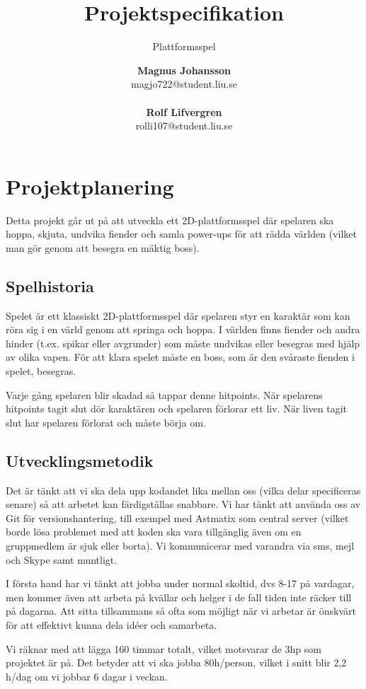 \documentclass{scrartcl}
\author{\textbf{Magnus Johansson}\\
		magjo722@student.liu.se\\ \\
		\textbf{Rolf Lifvergren}\\
		rolli107@student.liu.se}
\title{Projektspecifikation}
\subtitle{Plattformsspel}
\begin{document}
\maketitle
\clearpage

\section{Projektplanering}
Detta projekt går ut på att utveckla ett 2D-plattformsspel där spelaren ska hoppa, skjuta, undvika fiender och samla power-ups för att rädda världen (vilket man gör genom att besegra en mäktig boss).

\subsection{Spelhistoria}
Spelet är ett klassiskt 2D-plattformsspel där spelaren styr en karaktär som kan röra sig i en värld genom att springa och hoppa. I världen finns fiender och andra hinder (t.ex. spikar eller avgrunder) som måste undvikas eller besegras med hjälp av olika vapen. För att klara spelet måste en boss, som är den svåraste fienden i spelet, besegras.

Varje gång spelaren blir skadad så tappar denne hitpoints. När spelarens hitpoints tagit slut dör karaktären och spelaren förlorar ett liv. När liven tagit slut har spelaren förlorat och måste börja om. 

\subsection{Utvecklingsmetodik}\label{utvecklingsmetodik}
Det är tänkt att vi ska dela upp kodandet lika mellan oss (vilka delar specificeras senare) så att arbetet kan färdigställas snabbare. Vi har tänkt att använda oss av Git för versionshantering, till exempel med Astmatix som central server (vilket borde lösa problemet med att koden ska vara tillgänglig även om en gruppmedlem är sjuk eller borta). Vi kommunicerar med varandra via sms, mejl och Skype samt muntligt.

I första hand har vi tänkt att jobba under normal skoltid, dvs 8-17 på vardagar, men kommer även att arbeta på kvällar och helger i de fall tiden inte räcker till på dagarna. Att sitta tillsammans så ofta som möjligt när vi arbetar är önskvärt för att effektivt kunna dela idéer och samarbeta.

Vi räknar med att lägga 160 timmar totalt, vilket motsvarar de 3hp som projektet är på. Det betyder att vi ska jobba 80h/person, vilket i snitt blir 2{,}2 h/dag om vi jobbar 6 dagar i veckan.
\end{document}
